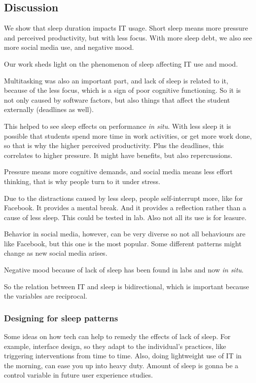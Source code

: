 \documentclass{IEEEtran}
\begin{document}
    \subsection{Discussion}
      We show that sleep duration impacts IT usage. Short sleep means more pressure and perceived productivity, but with less focus. With more sleep debt, we also see more social media use, and negative mood. \par 
      Our work sheds light on the phenomenon of sleep affecting IT use and mood. \par 
      Multitasking was also an important part, and lack of sleep is related to it, because of the less focus, which is a sign of poor cognitive functioning. So it is not only caused by software factors, but also things that affect the student externally (deadlines as well). \par
      This helped to see sleep effects on performance \textit{in situ}. 
      With less sleep it is possible that students spend more time in work activities, or get more work done, so that is why the higher perceived productivity. Plus the deadlines, this correlates to higher pressure. It might have benefits, but also repercussions. \par 
      Pressure means more cognitive demands, and social media means less effort thinking, that is why people turn to it under stress. \par 
      Due to the distractions caused by less sleep, people self-interrupt more, like for Facebook. It provides a mental break. And it provides a reflection rather than a cause of less sleep. This could be tested in lab. Also not all its use is for leasure. \par 
      Behavior in social media, however, can be very diverse so not all behaviours are like Facebook, but this one is the most popular. Some different patterns might change as new social media arises. \par 
      Negative mood because of lack of sleep has been found in labs and now \textit{in situ}. \par 
      So the relation between IT and sleep is bidirectional, which is important because the variables are reciprocal. 
      \subsubsection{Designing for sleep patterns}
        Some ideas on how tech can help to remedy the effects of lack of sleep. For example, interface design, so they adapt to the individual's practices, like triggering interventions from time to time. Also, doing lightweight use of IT in the morning, can ease you up into heavy duty. Amount of sleep is gonna be a control variable in future user experience studies.  \par 
\end{document}
